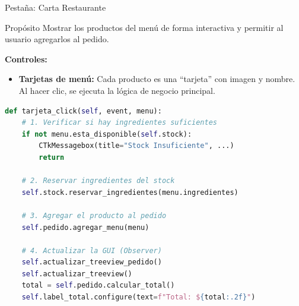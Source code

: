 \documentclass[12pt]{beamer}
\begin{document}
\begin{frame}{Pestaña: Carta Restaurante}
  \begin{block}{Propósito}
    Mostrar los productos del menú de forma interactiva y permitir al usuario agregarlos al pedido.
  \end{block}

  \textbf{Controles:}
  \begin{itemize}
    \item \textbf{Tarjetas de menú:} Cada producto es una ``tarjeta'' con imagen y nombre. Al hacer clic, se ejecuta la lógica de negocio principal.
  \end{itemize}

  \begin{lstlisting}[language=Python, caption={Lógica central de negocio al hacer clic}]
def tarjeta_click(self, event, menu):
    # 1. Verificar si hay ingredientes suficientes
    if not menu.esta_disponible(self.stock):
        CTkMessagebox(title="Stock Insuficiente", ...)
        return
    
    # 2. Reservar ingredientes del stock
    self.stock.reservar_ingredientes(menu.ingredientes)
    
    # 3. Agregar el producto al pedido
    self.pedido.agregar_menu(menu)
    
    # 4. Actualizar la GUI (Observer)
    self.actualizar_treeview_pedido()
    self.actualizar_treeview()
    total = self.pedido.calcular_total()
    self.label_total.configure(text=f"Total: ${total:.2f}")
  \end{lstlisting}
\end{frame}
\end{document}
